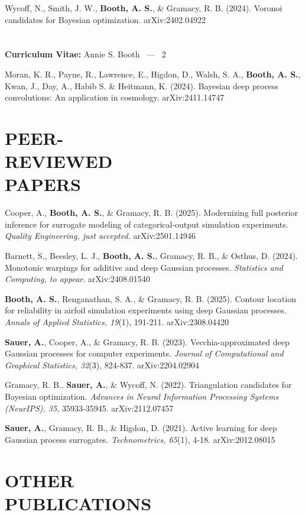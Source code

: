 \documentclass[margin,line,11pt]{res}
\begin{document}
\begin{resume}
Wycoff, N., Smith, J. W., {\bf Booth, A. S.}, \& Gramacy, R. B. (2024). Voronoi candidates 
for Bayesian optimization. arXiv:2402.04922

\pagebreak
\section{}
\hfill {\bf Curriculum Vitae:} Annie S. Booth \  --- \  2
\medskip

Moran, K. R., Payne, R., Lawrence, E., Higdon, D., Walsh, S. A., {\bf Booth, A. S.}, Kwan, J., Day, A., Habib S. \& Heitmann, K. (2024). Bayesian deep process convolutions: An application in cosmology. arXiv:2411.14747

\section{\bf{PEER- \\ REVIEWED \\ PAPERS}}

Cooper, A., {\bf Booth, A. S.}, \& Gramacy, R. B. (2025). Modernizing full posterior inference for surrogate modeling of categorical-output simulation experiments. {\it Quality Engineering, just accepted.} arXiv:2501.14946

Barnett, S., Beesley, L. J., {\bf Booth, A. S.}, Gramacy, R. B., \& Osthus, D. (2024). Monotonic 
warpings for additive and deep Gaussian processes. {\it Statistics and Computing, to appear}. arXiv:2408.01540

{\bf Booth, A. S.}, Renganathan, S. A., \& Gramacy, R. B. (2025). Contour location
for reliability in airfoil simulation experiments using deep Gaussian
processes.  {\it Annals of Applied Statistics, 19}(1), 191-211. arXiv:2308.04420

{\bf Sauer, A.}, Cooper, A., \& Gramacy, R. B. (2023). Vecchia-approximated
deep Gaussian processes for computer experiments. {\it Journal of Computational
and Graphical Statistics, 32}(3), 824-837. arXiv:2204.02904

Gramacy, R. B., {\bf Sauer, A.}, \& Wycoff, N. (2022). Triangulation 
candidates for Bayesian optimization. {\it Advances in Neural Information
Processing Systems (NeurIPS), 35,} 35933-35945. arXiv:2112.07457

{\bf Sauer, A.}, Gramacy, R. B., \& Higdon, D. (2021). Active learning 
for deep Gaussian process surrogates. {\it Technometrics, 65}(1), 4-18. 
arXiv:2012.08015

\section{OTHER \\ PUBLICATIONS}


\end{resume}
\end{document}
